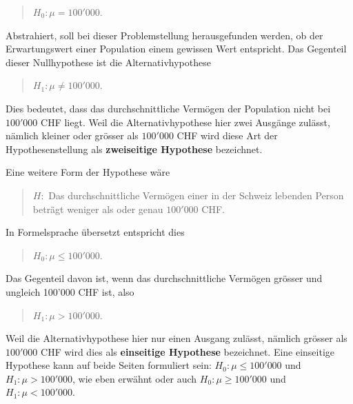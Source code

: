 \documentclass[
]{book}
\theoremstyle{definition}
\theoremstyle{definition}
\theoremstyle{definition}
\theoremstyle{definition}
\theoremstyle{remark}
\begin{document}
\begin{quote}
\(H_0:\mu = 100'000\).
\end{quote}

Abstrahiert, soll bei dieser Problemstellung herausgefunden werden, ob der Erwartungswert einer Population einem gewissen Wert entspricht. Das Gegenteil dieser Nullhypothese ist die Alternativhypothese

\begin{quote}
\(H_1: \mu \neq 100'000\).
\end{quote}

Dies bedeutet, dass das durchschnittliche Vermögen der Population nicht bei \(100'000\) CHF liegt. \label{customdef-zweiseitige-hypothese}{Weil die Alternativhypothese hier zwei Ausgänge zulässt, nämlich kleiner oder grösser als \(100'000\) CHF wird diese Art der Hypothesenstellung als \textbf{zweiseitige Hypothese} bezeichnet.}

Eine weitere Form der Hypothese wäre

\begin{quote}
\(H:\) Das durchschnittliche Vermögen einer in der Schweiz lebenden Person beträgt weniger als oder genau \(100'000\) CHF.
\end{quote}

In Formelsprache übersetzt entspricht dies

\begin{quote}
\(H_0: \mu \leq 100'000\).
\end{quote}

Das Gegenteil davon ist, wenn das durchschnittliche Vermögen grösser und ungleich 100'000 CHF ist, also

\begin{quote}
\(H_1: \mu > 100'000\).
\end{quote}

\label{customdef-einseitige-hypothese}{Weil die Alternativhypothese hier nur einen Ausgang zulässt, nämlich grösser als \(100'000\) CHF wird dies als \textbf{einseitige Hypothese} bezeichnet. Eine einseitige Hypothese kann auf beide Seiten formuliert sein: \(H_0:\mu \leq 100'000\) und \(H_1: \mu > 100'000\), wie eben erwähnt oder auch \(H_0:\mu \geq 100'000\) und \(H_1: \mu < 100'000\).}
\end{document}
